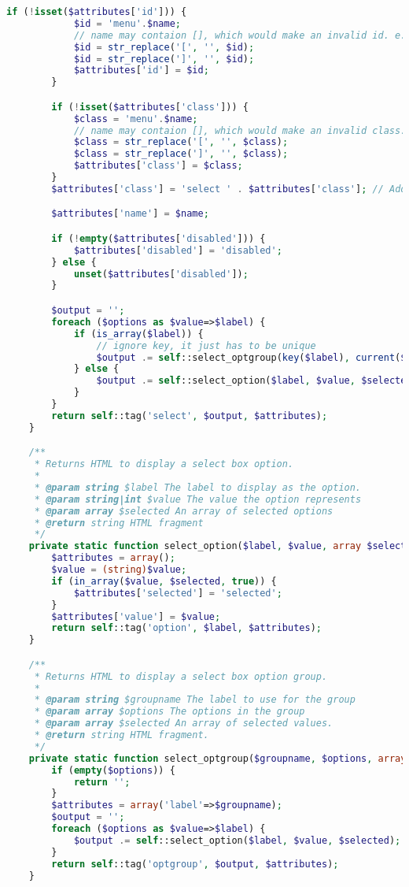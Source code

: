 \begin{lstlisting}[language=PHP]
        if (!isset($attributes['id'])) {
            $id = 'menu'.$name;
            // name may contaion [], which would make an invalid id. e.g. numeric question type editing form, assignment quickgrading
            $id = str_replace('[', '', $id);
            $id = str_replace(']', '', $id);
            $attributes['id'] = $id;
        }

        if (!isset($attributes['class'])) {
            $class = 'menu'.$name;
            // name may contaion [], which would make an invalid class. e.g. numeric question type editing form, assignment quickgrading
            $class = str_replace('[', '', $class);
            $class = str_replace(']', '', $class);
            $attributes['class'] = $class;
        }
        $attributes['class'] = 'select ' . $attributes['class']; // Add 'select' selector always

        $attributes['name'] = $name;

        if (!empty($attributes['disabled'])) {
            $attributes['disabled'] = 'disabled';
        } else {
            unset($attributes['disabled']);
        }

        $output = '';
        foreach ($options as $value=>$label) {
            if (is_array($label)) {
                // ignore key, it just has to be unique
                $output .= self::select_optgroup(key($label), current($label), $selected);
            } else {
                $output .= self::select_option($label, $value, $selected);
            }
        }
        return self::tag('select', $output, $attributes);
    }

    /**
     * Returns HTML to display a select box option.
     *
     * @param string $label The label to display as the option.
     * @param string|int $value The value the option represents
     * @param array $selected An array of selected options
     * @return string HTML fragment
     */
    private static function select_option($label, $value, array $selected) {
        $attributes = array();
        $value = (string)$value;
        if (in_array($value, $selected, true)) {
            $attributes['selected'] = 'selected';
        }
        $attributes['value'] = $value;
        return self::tag('option', $label, $attributes);
    }

    /**
     * Returns HTML to display a select box option group.
     *
     * @param string $groupname The label to use for the group
     * @param array $options The options in the group
     * @param array $selected An array of selected values.
     * @return string HTML fragment.
     */
    private static function select_optgroup($groupname, $options, array $selected) {
        if (empty($options)) {
            return '';
        }
        $attributes = array('label'=>$groupname);
        $output = '';
        foreach ($options as $value=>$label) {
            $output .= self::select_option($label, $value, $selected);
        }
        return self::tag('optgroup', $output, $attributes);
    }


\end{lstlisting}
